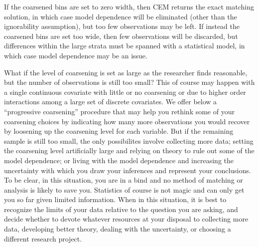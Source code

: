 \documentclass[article]{jss}
\begin{document}
If the coarsened bins are set to zero width, then CEM returns the
exact matching solution, in which case model dependence will be
eliminated (other than the ignorability assumption), but too few
observations may be left.  If instead the coarsened bins are set too
wide, then few observations will be discarded, but differences within
the large strata must be spanned with a statistical model, in which
case model dependence may be an issue.

What if the level of coarsening is set as large as the researcher
finds reasonable, but the number of observations is still too small?
This of course may happen with a single continuous covariate with
little or no coarsening or due to higher order interactions among a
large set of discrete covariates.  We offer below a ``progressive
coarsening'' procedure that may help you rethink some of your
coarsening choices by indicating how many more observations you would
recover by loosening up the coarsening level for each variable.  But
if the remaining sample is still too small, the only possibilites
involve collecting more data; setting the coarsening level
artificially large and relying on theory to rule out some of the model
dependence; or living with the model dependence and increasing the
uncertainty with which you draw your inferences and represent your
conclusions.  To be clear, in this situation, you are in a bind and no
method of matching or analysis is likely to save you.  Statistics of
course is not magic and can only get you so far given limited
information.  When in this situation, it is best to recognize the
limits of your data relative to the question you are asking, and
decide whether to devote whatever resources at your disposal to
collecting more data, developing better theory, dealing with the
uncertainty, or choosing a different research project.
\end{document}
